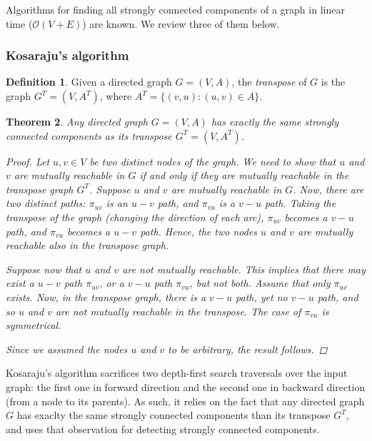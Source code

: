 \documentclass[english]{tktltiki2}
\newtheorem{mythm}{Theorem}[section]
\theoremstyle{definition}
\newtheorem{mydef}[mythm]{Definition}
\theoremstyle{remark}
\begin{document}
Algorithms for finding all strongly connected components of a graph in linear time ($\mathcal{O}(V + E)$) are known. We review three of them below.

\subsubsection{Kosaraju's algorithm}

\begin{mydef}
Given a directed graph $G = (V, A)$, the \textit{transpose} of $G$ is the graph $G^T = (V, A^T)$, where $A^T = \{ (v, u) \colon (u, v) \in A \}$.
\end{mydef}

\begin{mythm}
Any directed graph $G = (V,A)$ has exactly the same strongly connected components as its transpose $G^T = (V, A^T)$.

\begin{proof}
Let $u, v \in V$ be two distinct nodes of the graph. We need to show that $u$ and $v$ are mutually reachable in $G$ if and only if they are mutually reachable in the transpose graph $G^T$. Suppose $u$ and $v$ are mutually reachable in $G$. Now, there are two distinct paths: $\pi_{uv}$ is an $u-v$ path, and $\pi_{vu}$ is a $v-u$ path. Taking the transpose of the graph (changing the direction of each arc), $\pi_{uv}$ becomes a $v-u$ path, and $\pi_{vu}$ becomes a $u-v$ path. Hence, the two nodes $u$ and $v$ are mutually reachable also in the transpose graph. 

Suppose now that $u$ and $v$ are not mutually reachable. This implies that there may exist a $u-v$ path $\pi_{uv}$, or a $v-u$ path $\pi_{vu}$, but not both. Assume that only $\pi_{uv}$ exists. Now, in the transpose graph, there is a $v-u$ path, yet no $v-u$ path, and so $u$ and $v$ are not mutually reachable in the transpose. The case of $\pi_{vu}$ is symmetrical. 

Since we assumed the nodes $u$ and $v$ to be arbitrary, the result follows.
\end{proof}
\end{mythm}

Kosaraju's algorithm sacrifices two depth-first search traversals over the input graph: the first one in forward direction and the second one in backward direction (from a node to its parents). As such, it relies on the fact that any directed graph $G$ has exaclty the same strongly connected components than its transpose $G^T$, and uses that observation for detecting strongly connected components.
\end{document}
